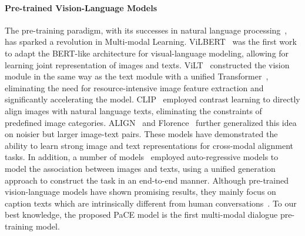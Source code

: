 \documentclass[11pt]{article}
\begin{document}
\paragraph{Pre-trained Vision-Language Models}
The pre-training paradigm, with its successes in natural language processing~\citep{devlin2018bert,radford2019language}, has sparked a revolution in Multi-modal Learning. ViLBERT~\citep{lu2019vilbert} was the first work to adapt the BERT-like architecture for visual-language modeling, allowing for learning joint representation of images and texts. ViLT~\citep{kim2021vilt} constructed the vision module in the same way as the text module with a unified Transformer~\citep{vaswani2017attention}, eliminating the need for resource-intensive image feature extraction and significantly accelerating the model. CLIP~\citep{radford2021learning} employed contrast learning to directly align images with natural language texts, eliminating the constraints of predefined image categories. ALIGN~\citep{jia2021scaling} and Florence~\citep{yuan2021florence} further generalized this idea on noisier but larger image-text pairs. These models have demonstrated the ability to learn strong image and text representations for cross-modal alignment tasks. In addition, a number of models~\citep{cho2021unifying,wang2021simvlm,wang2022unifying,yu2022coca,alayrac2022flamingo} employed auto-regressive models to model the association between images and texts, using a unified generation approach to construct the task in an end-to-end manner. Although pre-trained vision-language models have shown promising results, they mainly focus on caption texts which are intrinsically different from human conversations~\citep{kulhanek2021augpt}. To our best knowledge, the proposed PaCE model is the first multi-modal dialogue pre-training model. 
\end{document}
